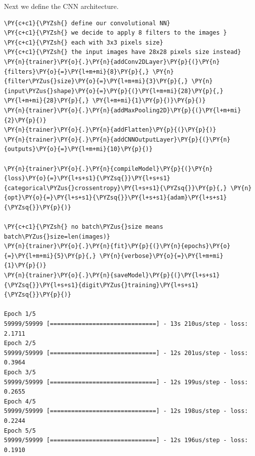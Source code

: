 Next we define the CNN architecture.

\begin{tcolorbox}[breakable, size=fbox, boxrule=1pt, pad at break*=1mm,colback=cellbackground, colframe=cellborder]
\begin{Verbatim}[commandchars=\\\{\}]
\PY{c+c1}{\PYZsh{} define our convolutional NN}
\PY{c+c1}{\PYZsh{} we decide to apply 8 filters to the images }
\PY{c+c1}{\PYZsh{} each with 3x3 pixels size}
\PY{c+c1}{\PYZsh{} the input images have 28x28 pixels size instead}
\PY{n}{trainer}\PY{o}{.}\PY{n}{addConv2DLayer}\PY{p}{(}\PY{n}{filters}\PY{o}{=}\PY{l+m+mi}{8}\PY{p}{,} \PY{n}{filter\PYZus{}size}\PY{o}{=}\PY{l+m+mi}{3}\PY{p}{,} \PY{n}{input\PYZus{}shape}\PY{o}{=}\PY{p}{(}\PY{l+m+mi}{28}\PY{p}{,} \PY{l+m+mi}{28}\PY{p}{,} \PY{l+m+mi}{1}\PY{p}{)}\PY{p}{)}
\PY{n}{trainer}\PY{o}{.}\PY{n}{addMaxPooling2D}\PY{p}{(}\PY{l+m+mi}{2}\PY{p}{)}
\PY{n}{trainer}\PY{o}{.}\PY{n}{addFlatten}\PY{p}{(}\PY{p}{)}
\PY{n}{trainer}\PY{o}{.}\PY{n}{addCNNOutputLayer}\PY{p}{(}\PY{n}{outputs}\PY{o}{=}\PY{l+m+mi}{10}\PY{p}{)}
	
\PY{n}{trainer}\PY{o}{.}\PY{n}{compileModel}\PY{p}{(}\PY{n}{loss}\PY{o}{=}\PY{l+s+s1}{\PYZsq{}}\PY{l+s+s1}{categorical\PYZus{}crossentropy}\PY{l+s+s1}{\PYZsq{}}\PY{p}{,} \PY{n}{opt}\PY{o}{=}\PY{l+s+s1}{\PYZsq{}}\PY{l+s+s1}{adam}\PY{l+s+s1}{\PYZsq{}}\PY{p}{)}
	
\PY{c+c1}{\PYZsh{} no batch\PYZus{}size means batch\PYZus{}size=len(images)}
\PY{n}{trainer}\PY{o}{.}\PY{n}{fit}\PY{p}{(}\PY{n}{epochs}\PY{o}{=}\PY{l+m+mi}{5}\PY{p}{,} \PY{n}{verbose}\PY{o}{=}\PY{l+m+mi}{1}\PY{p}{)}
\PY{n}{trainer}\PY{o}{.}\PY{n}{saveModel}\PY{p}{(}\PY{l+s+s1}{\PYZsq{}}\PY{l+s+s1}{digit\PYZus{}training}\PY{l+s+s1}{\PYZsq{}}\PY{p}{)}

Epoch 1/5
59999/59999 [==============================] - 13s 210us/step - loss: 2.1711
Epoch 2/5
59999/59999 [==============================] - 12s 201us/step - loss: 0.3964
Epoch 3/5
59999/59999 [==============================] - 12s 199us/step - loss: 0.2655
Epoch 4/5
59999/59999 [==============================] - 12s 198us/step - loss: 0.2244
Epoch 5/5
59999/59999 [==============================] - 12s 196us/step - loss: 0.1910
\end{Verbatim}
\end{tcolorbox}

